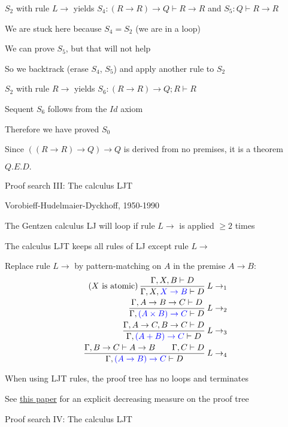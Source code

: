 $S_{2}$ with rule $L\rightarrow$ yields $S_{4}:\left(R\rightarrow R\right)\rightarrow Q\vdash R\rightarrow R$
and $S_{5}:Q\vdash R\rightarrow R$

We are stuck here because $S_{4}=S_{2}$ (we are in a loop)

We can prove $S_{5}$, but that will not help

So we backtrack (erase $S_{4}$, $S_{5}$) and apply another rule
to $S_{2}$

$S_{2}$ with rule $R\rightarrow$ yields $S_{6}:\left(R\rightarrow R\right)\rightarrow Q;R\vdash R$

Sequent $S_{6}$ follows from the $Id$ axiom

Therefore we have proved $S_{0}$

Since $\left(\left(R\rightarrow R\right)\rightarrow Q\right)\rightarrow Q$
is derived from no premises, it is a theorem

$Q.E.D.$

Proof search III: The calculus LJT

Vorobieff-Hudelmaier-Dyckhoff, 1950-1990

The Gentzen calculus LJ will loop if rule $L\rightarrow$ is applied
$\geq2$ times

The calculus LJT keeps all rules of LJ except rule $L\rightarrow$

Replace rule $L\rightarrow$ by pattern-matching on $A$ in the premise
$A\rightarrow B$:
\begin{align*}
\text{(}X\text{ is atomic)\,}\frac{\Gamma,X,B\vdash D}{\Gamma,X,{\color{blue}X\rightarrow B}\vdash D}\:L\rightarrow_{1}\\
\frac{\Gamma,A\rightarrow B\rightarrow C\vdash D}{\Gamma,{\color{blue}(A\times B)\rightarrow C}\vdash D}\:L\rightarrow_{2}\\
\frac{\Gamma,A\rightarrow C,B\rightarrow C\vdash D}{\Gamma,{\color{blue}(A+B)\rightarrow C}\vdash D}\:L\rightarrow_{3}\\
\frac{\Gamma,B\rightarrow C\vdash A\rightarrow B\quad\quad\Gamma,C\vdash D}{\Gamma,{\color{blue}(A\rightarrow B)\rightarrow C}\vdash D}\:L\rightarrow_{4}
\end{align*}

When using LJT rules, the proof tree has no loops and terminates

See \href{http://citeseer.ist.psu.edu/viewdoc/summary?doi=10.1.1.35.2618}{this paper}
for an explicit decreasing measure on the proof tree

Proof search IV: The calculus LJT

